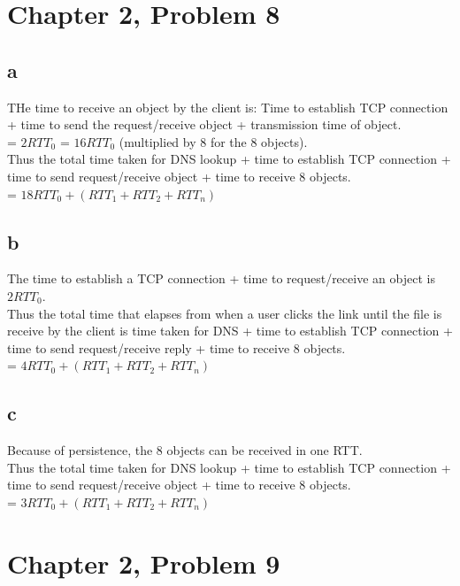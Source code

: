 \documentclass{article}
\begin{document}
\section{Chapter 2, Problem 8}
\subsection{a}
THe time to receive an object by the client is: Time to establish TCP connection + time to send the request/receive object + transmission time of object.\\
\newline = $2RTT_0$ = $16RTT_0$ (multiplied by 8 for the 8 objects).\\
\newline Thus the total time taken for DNS lookup + time to establish TCP connection + time to send request/receive object + time to receive 8 objects.\\
\newline = $18RTT_0 + (RTT_1 + RTT_2 + RTT_n)$\\

\subsection{b}
The time to establish a TCP connection + time to request/receive an object is $2RTT_0$.\\
\newline Thus the total time that elapses from when a user clicks the link until the file is receive by the client is time taken for DNS + time to establish TCP connection + time to send request/receive reply + time to receive 8 objects.\\
\newline = $4RTT_0 + (RTT_1 + RTT_2 + RTT_n)$\\

\subsection{c}
Because of persistence, the 8 objects can be received in one RTT.\\
Thus the total time taken for DNS lookup + time to establish TCP connection + time to send request/receive object + time to receive 8 objects.\\
\newline = $3RTT_0 + (RTT_1 + RTT_2 + RTT_n)$\\

\section{Chapter 2, Problem 9}
\end{document}
